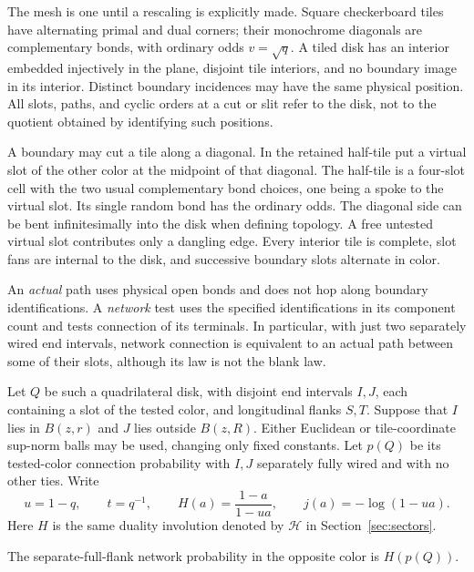 \begin{convention}\label{disk:conventions}
The mesh is one until a rescaling is explicitly made.  Square
checkerboard tiles have alternating primal and dual corners; their
monochrome diagonals are complementary bonds, with ordinary odds
\(v=\sqrt q\).  A tiled disk has an interior embedded injectively in
the plane, disjoint tile interiors, and no boundary image in its
interior.  Distinct boundary incidences may have the same physical
position.  All slots, paths, and cyclic orders at a cut or slit refer
to the disk, not to the quotient obtained by identifying such positions.

A boundary may cut a tile along a diagonal.  In the retained half-tile
put a virtual slot of the other color at the midpoint of that diagonal.
The half-tile is a four-slot cell with the two usual complementary bond
choices, one being a spoke to the virtual slot.  Its single random
bond has the ordinary odds.  The diagonal side can be bent infinitesimally
into the disk when defining topology.  A free untested virtual slot
contributes only a dangling edge.  Every interior tile is complete,
slot fans are internal to the disk, and successive boundary slots
alternate in color.

An \emph{actual} path uses physical open bonds and does not hop along
boundary identifications.  A \emph{network} test uses the specified
identifications in its component count and tests connection of its
terminals.  In particular, with just two separately wired end intervals,
network connection is equivalent to an actual path between some of
their slots, although its law is not the blank law.
\end{convention}

Let \(Q\) be such a quadrilateral disk, with disjoint end intervals
\(I,J\), each containing a slot of the tested color, and longitudinal
flanks \(S,T\).  Suppose that \(I\) lies in \(B(z,r)\) and
\(J\) lies outside \(B(z,R)\).  Either Euclidean or tile-coordinate
sup-norm balls may be used, changing only fixed constants.  Let \(p(Q)\)
be its tested-color connection probability with \(I,J\) separately
fully wired and with no other ties.  Write
\[
 u=1-q,\qquad t=q^{-1},\qquad
 H(a)=\frac{1-a}{1-u a},\qquad
 j(a)=-\log(1-u a).
\]
Here \(H\) is the same duality involution denoted by \(\mathcal H\)
in Section~\ref{sec:sectors}.

\begin{lemma}\label{disk:dual-test}
The separate-full-flank network probability in the opposite color is
\(H(p(Q))\).
\end{lemma}

